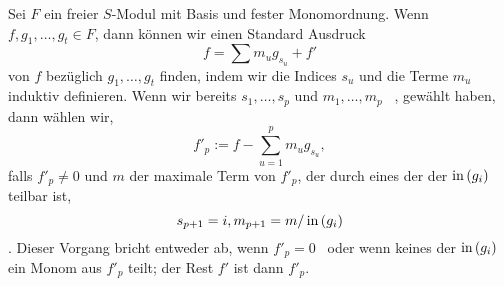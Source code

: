 \documentclass{article}
\begin{document}
	\begin{algo}
		Sei 
		\( F \)
		ein freier 
		\( S\)-Modul
		mit Basis und fester Monomordnung.
		Wenn
		\( f,g_1,\dots,g_t \in F \),
		dann k\"onnen wir einen Standard Ausdruck
		\[
		        f=\sum m_u g_{s_u} +f'
		\]
		von
		\( f \)
		bez\"uglich 
		\( g_1,\dots,g_t \)
		finden,
		indem wir die Indices
		\( s_{u} \)
		und die Terme
		\(m_{u} \)
		induktiv definieren.
		Wenn wir bereits 
		\( s_1,\dots,s_p \)
		und
		\( m_1,\dots,m_p\) \ ,
		gew\"ahlt haben,
		dann w\"ahlen wir, 
		\[
			f'_p:=f-\sum_{u=1}^{p} m_u g_{s_u},
		\]
		falls  
		\( f'_{p} \neq 0 \)
		und
		\( m \) 
		der maximale Term von 
		\(f'_p \),
		der durch eines der der
		\( \operatorname{in}\left( g_i \right) \)
		teilbar ist,
		\[
			s_{p+1}=i , \\
			m_{p+1}=m / \operatorname{in}\left( g_i \right)
		\].
		Dieser Vorgang bricht entweder ab, wenn 
		\( f'_p=0 \) \
		oder wenn keines der
		\( \operatorname{in}\left( g_i \right) \) 
		ein Monom aus 
		\( f'_p\)
		teilt;
		der Rest 
		\(f'\) 
		ist dann 
		\( f'_p \).
	\end{algo}
\end{document}
